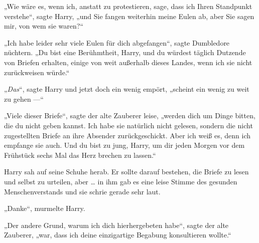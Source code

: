 „Wie wäre es, wenn ich, anstatt zu protestieren, sage, dass ich Ihren Standpunkt verstehe“, sagte Harry, „und Sie fangen weiterhin meine Eulen ab, aber Sie sagen mir, von wem sie waren?“

„Ich habe leider sehr viele Eulen für dich abgefangen“, sagte Dumbledore nüchtern.
„Du bist eine Berühmtheit, Harry, und du würdest täglich Dutzende von Briefen erhalten, einige von weit außerhalb dieses Landes, wenn ich sie nicht zurückweisen würde.“

„\emph{Das}“, sagte Harry und jetzt doch ein wenig empört, „scheint ein wenig zu weit zu gehen —“

„Viele dieser Briefe“, sagte der alte Zauberer leise, „werden dich um Dinge bitten, die du nicht geben kannst. Ich habe sie natürlich nicht gelesen, sondern die nicht zugestellten Briefe an ihre Absender zurückgeschickt. Aber ich weiß es, denn ich empfange sie auch. Und du bist zu jung, Harry, um dir jeden Morgen vor dem Frühstück sechs Mal das Herz brechen zu lassen.“

Harry sah auf seine Schuhe herab. Er sollte darauf bestehen, die Briefe zu lesen und selbst zu urteilen, aber … in ihm gab es eine leise Stimme des gesunden Menschenverstands und sie schrie gerade sehr laut.

„Danke“, murmelte Harry.

„Der andere Grund, warum ich dich hierhergebeten habe“, sagte der alte Zauberer, „war, dass ich deine einzigartige Begabung konsultieren wollte.“

